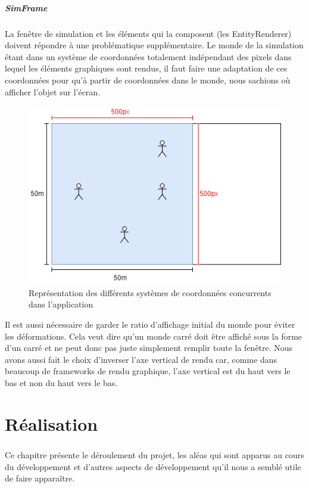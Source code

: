 \documentclass{EPUProjetDi}
\begin{document}
\paragraph{SimFrame}

La fenêtre de simulation et les éléments qui la composent (les EntityRenderer) doivent répondre à une problématique supplémentaire.
Le monde de la simulation étant dans un système de coordonnées totalement indépendant des pixels dans lequel les éléments graphiques sont
rendus, il faut faire une adaptation de ces coordonnées pour qu'à partir de coordonnées dans le monde, nous sachions où afficher l'objet sur l'écran.

\begin{figure}[h]
    \centering
    \includegraphics[scale=0.7]{simframe.png}
    \caption{Représentation des différents systèmes de coordonnées concurrents dans l'application}
    \label{fig:simframe}
\end{figure}

Il est aussi nécessaire de garder le ratio d'affichage initial du monde pour éviter les déformations. Cela veut dire qu'un monde carré 
doit être affiché sous la forme d'un carré et ne peut donc pas juste simplement remplir toute la fenêtre. Nous avons aussi fait le choix 
d'inverser l'axe vertical de rendu car, comme dans beaucoup de frameworks de rendu graphique, l'axe vertical est du haut vers le bas et non du 
haut vers le bas.

\chapter{Réalisation}

\paragraph{}
Ce chapitre présente le déroulement du projet, les aléas qui sont apparus au cours du 
développement et d'autres aspects de développement qu'il nous a semblé 
utile de faire apparaître.
\end{document}
